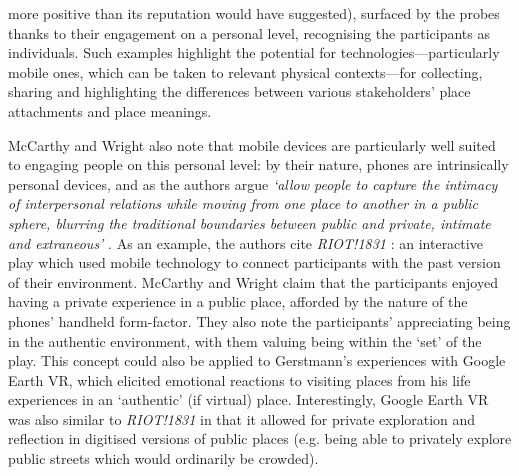 more positive than its reputation would have suggested), surfaced by the probes thanks to their engagement on a personal level, recognising the participants as individuals. Such examples highlight the potential for technologies---particularly mobile ones, which can be taken to relevant physical contexts---for collecting, sharing and highlighting the differences between various stakeholders' place attachments and place meanings.

McCarthy and Wright also note that mobile devices are particularly well suited to engaging people on this personal level: by their nature, phones are intrinsically personal devices, and as the authors argue \textit{`allow people to capture the intimacy of interpersonal relations while moving from one place to another in a public sphere, blurring the traditional boundaries between public and private, intimate and extraneous'} \citep{McCarthy2005}. As an example, the authors cite \textit{RIOT!1831} \citep{Blythe2006}: an interactive play which used mobile technology to connect participants with the past version of their environment. McCarthy and Wright claim that the participants enjoyed having a private experience in a public place, afforded by the nature of the phones' handheld form-factor. They also note the participants' appreciating being in the authentic environment, with them valuing being within the `set' of the play. This concept could also be applied to Gerstmann's experiences with Google Earth VR, which elicited emotional reactions to visiting places from his life experiences in an `authentic' (if virtual) place. Interestingly, Google Earth VR was also similar to \textit{RIOT!1831} in that it allowed for private exploration and reflection in digitised versions of public places (e.g. being able to privately explore public streets which would ordinarily be crowded).

